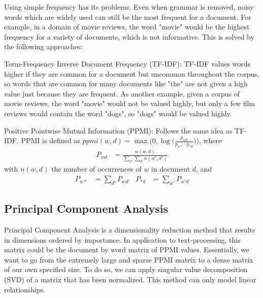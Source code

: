 Using simple frequency has its problems. Even when grammar is removed, noisy words which are widely used can still be the most frequent for a document. For example, in a domain of movie reviews, the word "movie" would be the highest frequency for a variety of documents, which is not informative. This is solved by the following approaches:

Term-Frequency Inverse Document Frequency (TF-IDF): TF-IDF values words higher if they  are common for a document but uncommon throughout the corpus, so words that are common for many documents like "the" are not given a high value just because they are frequent. As another  example, given a corpus of movie reviews, the word "movie" would not be valued highly, but only a few film reviews would contain the word "dogs", so "dogs" would be valued highly. 

Positive Pointwise Mutual Information (PPMI): Follows the same idea as TF-IDF. 	PPMI is defined  as $\textit{ppmi}(w,d) = \max \big(0, \log\big(\frac{p_{wd}}{p_{w*} \cdotp p_{*d}}\big)\big)$, where
\begin{align*}
P_{wd} &= \frac{n(w, d)}{\sum_{w'} \sum_{d'} n(w', d')}
\end{align*}
with $n(w,d)$ the number of occurrences of $w$ in document $d$, and
\begin{align*}
P_{w*} &= \sum_{d'} P_{wd'} &
P_{*d} &= \sum_{w'} P_{w'd}
\end{align*}

\subsection{Principal Component Analysis}

Principal Component Analysis is a dimensionality reduction method that results in dimensions ordered by importance. In application to text-processing, this matrix could be the document by word matrix of PPMI values. Essentially, we want to go from the extremely large and sparse PPMI matrix to a dense matrix of our own specified size. To do so, we can apply singular value decomposition (SVD) of a matrix that has been normalized. This method can only model linear relationships.



